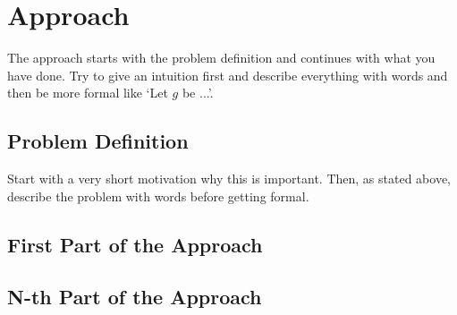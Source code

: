 \chapter{Approach}\label{chap:approach}
The approach starts with the problem definition and continues with what you have done. Try to give an intuition first and describe everything with words and then be more formal like `Let $g$ be ...'.

\section{Problem Definition}
Start with a very short motivation why this is important. Then, as stated above, describe the problem with words before getting formal.

\section{First Part of the Approach}

\section{N-th Part of the Approach}